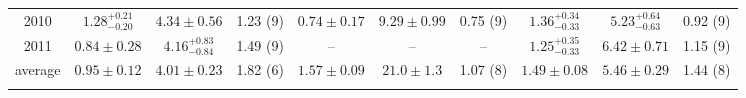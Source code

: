 \documentclass[]{raa}
\begin{document}
\begin{table}
\begin{tabular}{cccccccccc}
2010 & $1.28_{-0.20}^{+0.21}$ & $4.34 \pm 0.56$ & 1.23 (9) & $0.74 \pm 0.17$ & $9.29 \pm 0.99$ & 0.75 (9) & $1.36_{-0.33}^{+0.34}$ & $5.23_{-0.63}^{+0.64}$ & 0.92 (9) \\
2011 & $0.84 \pm 0.28$ & $4.16_{-0.84}^{+0.83}$ & 1.49 (9) & -- & -- & -- & $1.25_{-0.33}^{+0.35}$ & $6.42 \pm 0.71$ & 1.15 (9) \\ 
average & $0.95 \pm 0.12$ & $4.01 \pm 0.23 $ & 1.82 (6) & $1.57 \pm 0.09$ & $21.0 \pm 1.3$ & 1.07 (8) &  $1.49 \pm 0.08$ & $5.46 \pm 0.29$ & 1.44 (8) \\
  \noalign{\smallskip}\hline
\end{tabular}
\ec
\end{table}



\end{document}
